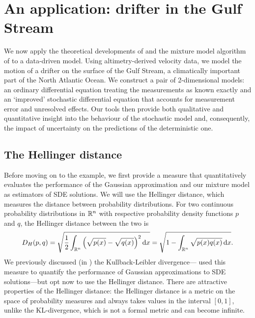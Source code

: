 \chapter{An application: drifter in the Gulf Stream}\label{ch:appls}
We now apply the theoretical developments of  and the mixture model algorithm of  to a data-driven model.
Using altimetry-derived velocity data, we model the motion of a drifter on the surface of the Gulf Stream, a climatically important part of the North Atlantic Ocean.
We construct a pair of 2-dimensional models: an ordinary differential equation treating the measurements as known exactly and an `improved' stochastic differential equation that accounts for measurement error and unresolved effects.
Our tools then provide both qualitative and quantitative insight into the behaviour of the stochastic model and, consequently, the impact of uncertainty on the predictions of the deterministic one.


\section{The Hellinger distance}
Before moving on to the example, we first provide a measure that quantitatively evaluates the performance of the Gaussian approximation and our mixture model as estimators of SDE solutions.
We will use the Hellinger distance, which measures the distance between probability distributions.
For two continuous probability distributions in \(\mathbb{R}^n\) with respective probability density functions \(p\) and \(q\), the Hellinger distance between the two is \citep{LeCamLoYang_2000_AsymptoticsStatistics}
\begin{equation}\label{eqn:hell_dist}
	D_H\!\left(p, q\right) = \sqrt{\frac12 \int_{\R^n}{\left(\sqrt{p(x)} - \sqrt{q(x)}\right)^2\dif x}} = \sqrt{1 - \int_{\R^n}{\sqrt{p(x)q(x)}\dif x}}.
\end{equation}
We previously discussed (in ) the Kullback-Leibler divergence---\citet{Sanz-AlonsoStuart_2017_GaussianApproximationsSmall} used this measure to quantify the performance of Gaussian approximations to SDE solutions---but opt now to use the Hellinger distance.
There are attractive properties of the Hellinger distance: the Hellinger distance is a metric on the space of probability measures and always takes values in the interval \([0,1]\), unlike the KL-divergence, which is not a formal metric and can become infinite.

